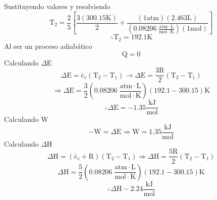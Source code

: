 \documentclass[12pt]{article}
\begin{document}
Sustituyendo valores y resolviendo
\begin{displaymath}
	\mathrm{T}_2=\frac{2}{5} \left[ \frac{3(300.15\mathrm{K})}{2}+\frac{(1\mathrm{atm})(2.463\mathrm{L})}{(0.08206\; \frac{\mathrm{atm}\cdot\mathrm{L}}{\mathrm{mol}\cdot\mathrm{K}})(1\mathrm{mol})} \right]
\end{displaymath}
\begin{displaymath}
	\therefore \mathrm{T}_2=192.1\mathrm{K}
\end{displaymath}
Al ser un proceso adiabático 
\begin{displaymath}
	\mathrm{Q}=0
\end{displaymath}
Calculando $\Delta\mathrm{E}$
\begin{displaymath}
	\Delta \mathrm{E}=\mathrm{\bar{c}}_v(\mathrm{T}_2-\mathrm{T}_1)\rightarrow \Delta\mathrm{E}=\frac{3\mathrm{R}}{2}\left( \mathrm{T}_2-\mathrm{T}_1 \right)
\end{displaymath}
\begin{displaymath}
	\Rightarrow \Delta\mathrm{E}=\frac{3}{2}\left( 0.08206\; \frac{\mathrm{atm}\cdot\mathrm{L}}{\mathrm{mol}\cdot\mathrm{K}} \right) \left( 192.1-300.15 \right)\mathrm{K}
\end{displaymath}
\begin{displaymath}
	\therefore \Delta\mathrm{E}=-1.35\frac{\mathrm{kJ}}{\mathrm{mol}}
\end{displaymath}
Calculando $\mathrm{W}$
\begin{displaymath}
	-\mathrm{W}=\Delta\mathrm{E}\Rightarrow \mathrm{W}=1.35\frac{\mathrm{kJ}}{\mathrm{mol}}
\end{displaymath}
Calculando $\Delta\mathrm{H}$
\begin{displaymath}
	\Delta\mathrm{H}=(\mathrm{\bar{c}}_v+\mathrm{R})(\mathrm{T}_2-\mathrm{T}_1)\Rightarrow \Delta\mathrm{H}=\frac{5\mathrm{R}}{2}(\mathrm{T}_2-\mathrm{T}_1)
\end{displaymath}
\begin{displaymath}
	\Delta\mathrm{H}=\frac{5}{2}\left( 0.08206\; \frac{\mathrm{atm}\cdot\mathrm{L}}{\mathrm{mol}\cdot\mathrm{K}} \right)\left( 192.1-300.15 \right)\mathrm{K}
\end{displaymath}
\begin{displaymath}
	\therefore \Delta\mathrm{H}-2.24 \frac{\mathrm{kJ}}{\mathrm{mol}}
\end{displaymath}
\end{document}
